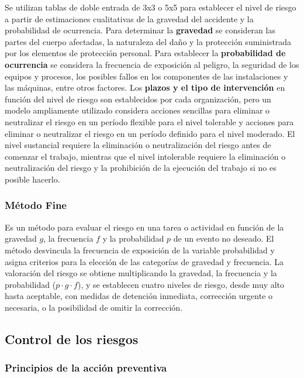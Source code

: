 Se utilizan tablas de doble entrada de 3x3 o 5x5 para establecer el nivel de
riesgo a partir de estimaciones cualitativas de la gravedad del accidente y la
\gls{probabilidad} de ocurrencia. Para determinar la \textbf{gravedad} se consideran
las partes del cuerpo afectadas, la naturaleza del daño y la protección
suministrada por los elementos de protección personal. Para establecer la
\textbf{\gls{probabilidad} de ocurrencia} se considera la frecuencia de exposición al
peligro, la seguridad de los equipos y procesos, los posibles fallos en los
componentes de las instalaciones y las máquinas, entre otros factores.
Los \textbf{plazos y el tipo de intervención} en función del nivel de riesgo
son establecidos por cada organización, pero un modelo ampliamente utilizado
considera acciones sencillas para eliminar o neutralizar el riesgo en un período
flexible para el nivel tolerable y acciones para eliminar o neutralizar el
riesgo en un período definido para el nivel moderado. El nivel sustancial
requiere la eliminación o neutralización del riesgo antes de comenzar el
trabajo, mientras que el nivel intolerable requiere la eliminación o
neutralización del riesgo y la prohibición de la ejecución del trabajo si no es
posible hacerlo.

\subsubsection{Método Fine}

Es un método para evaluar el riesgo en una tarea o actividad en función de la
gravedad $g$, la frecuencia $f$ y la \gls{probabilidad} $p$ de un evento no deseado.
El método desvincula la frecuencia de exposición de la variable probabilidad y
asigna criterios para la elección de las categorías de gravedad y frecuencia.
La valoración del riesgo se obtiene multiplicando la gravedad, la frecuencia y
la probabilidad ($p\cdot g \cdot f$), y se establecen cuatro niveles de riesgo,
desde muy alto hasta aceptable, con medidas de detención inmediata, corrección
urgente o necesaria, o la posibilidad de omitir la corrección.

\subsection{Control de los riesgos}

\subsubsection{Principios de la acción preventiva}

